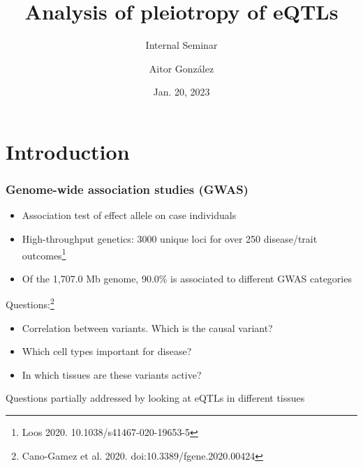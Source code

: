 \documentclass{beamer}
\title{Analysis of pleiotropy of eQTLs}
\subtitle{Internal Seminar}
\author{Aitor Gonz\'alez}
\institute{Aix Marseille Univ, INSERM, TAGC}
\date{Jan. 20, 2023}
\begin{document}
    \begin{frame}

        \titlepage

    \end{frame}

    \section{Introduction} %

    \begin{frame}
        \frametitle{Genome-wide association studies (GWAS)}

        \begin{itemize}
            \item Association test of effect allele on case individuals
            \item High-throughput genetics: 3000 unique loci for over 250 disease/trait outcomes\footnote{Loos 2020. 10.1038/s41467-020-19653-5}
            \item Of the 1,707.0 Mb genome, 90.0\% is associated to different GWAS categories
        \end{itemize}
%
        \vfill

        Questions:\footnote{Cano-Gamez et al. 2020. doi:10.3389/fgene.2020.00424}
%
        \begin{itemize}
            \item Correlation between variants. Which is the causal variant?
            \item Which cell types important for disease?
            \item In which tissues are these variants active?
        \end{itemize}
%
        \vfill
%
        Questions partially addressed by looking at eQTLs in different tissues

    \end{frame}
\end{document}

